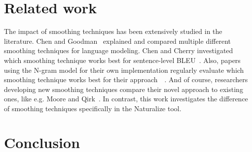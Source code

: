 \documentclass[sigconf]{acmart}
\begin{document}
\section{Related work}
The impact of smoothing techniques has been extensively studied in the literature. Chen and Goodman~\cite{smoothingStudy} explained and compared multiple different smoothing techniques for language modeling. Chen and Cherry investigated which smoothing technique works best for sentence-level BLEU~\cite{chen2014systematic}. Also, papers using the N-gram model for their own implementation regularly evaluate which smoothing technique works best for their approach~\cite{nestedngram}~\cite{vatanen2010language}. And of course, researchers developing new smoothing techniques compare their novel approach to existing ones, like e.g. Moore and Qirk~\cite{moore2009improved}. In contrast, this work investigates the difference of smoothing techniques specifically in the Naturalize tool.
\section{Conclusion}








\end{document}
